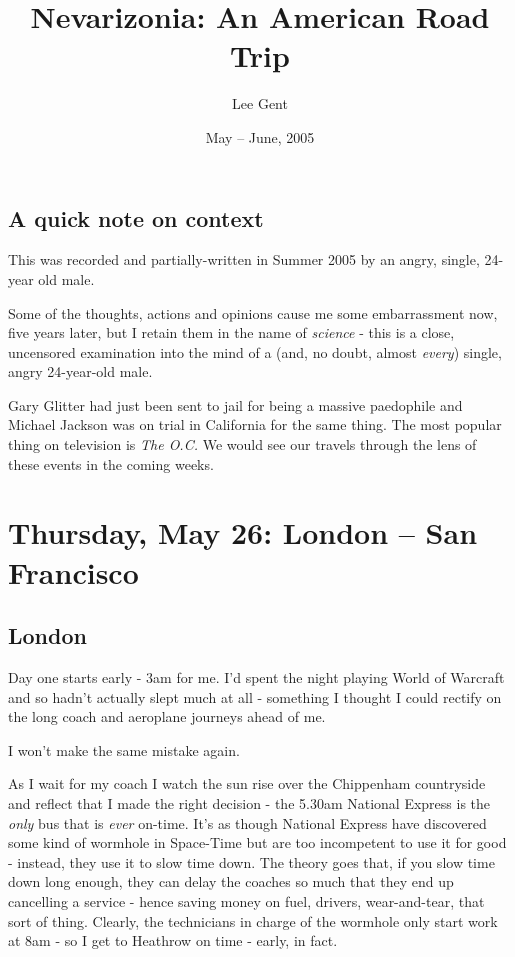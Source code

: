\documentclass[a5paper,titlepage,11pt,draft]{book}
\title{Nevarizonia: An American Road Trip}
\author{Lee Gent}
\date{May -- June, 2005}
\begin{document}
\frontmatter
\maketitle

\section*{A quick note on context}
This was recorded and partially-written in Summer 2005 by an angry, single, 24-year old male.

Some of the thoughts, actions and opinions cause me some embarrassment now, five years later, but I retain them in the name of \emph{science} - this is a close, uncensored examination into the mind of a (and, no doubt, almost \emph{every}) single, angry 24-year-old male.

Gary Glitter had just been sent to jail for being a massive paedophile and Michael Jackson was on trial in California for the same thing.  The most popular thing on television is \emph{The O.C.}  We would see our travels through the lens of these events in the coming weeks.

\vfill
{}

\mainmatter
\chapter[London -- San Francisco]{Thursday, May 26: London -- San Francisco}
\section*{London}
Day one starts early - 3am for me.  I'd spent the night playing World of Warcraft and so hadn't actually slept much at all - something I thought I could rectify on the long coach and aeroplane journeys ahead of me.

I won't make the same mistake again.

As I wait for my coach I watch the sun rise over the Chippenham countryside and reflect that I made the right decision - the 5.30am National Express is the \emph{only} bus that is \emph{ever} on-time.  It's as though National Express have discovered some kind of wormhole in Space-Time but are too incompetent to use it for good - instead, they use it to slow time down.  The theory goes that, if you slow time down long enough, they can delay the coaches so much that they end up cancelling a service - hence saving money on fuel, drivers, wear-and-tear, that sort of thing.  Clearly, the technicians in charge of the wormhole only start work at 8am - so I get to Heathrow on time - early, in fact.
\end{document}
